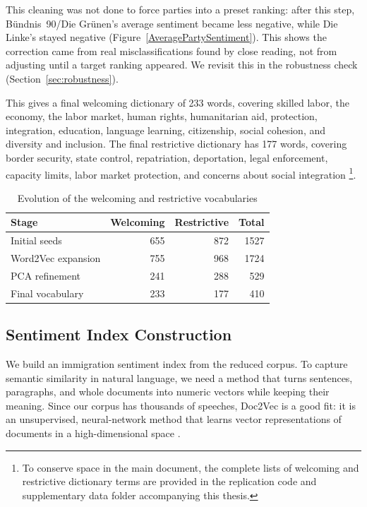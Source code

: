 \documentclass[12pt]{scrartcl}
\numberwithin{equation}{section}				%
\begin{document}
    This cleaning was not done to force parties into a preset ranking: after this step, Bündnis~90/Die Grünen's average sentiment became less negative, while Die Linke's stayed negative (Figure~\ref{AveragePartySentiment}). This shows the correction came from real misclassifications found by close reading, not from adjusting until a target ranking appeared. We revisit this in the robustness check (Section~\ref{sec:robustness}).
    
    This gives a final welcoming dictionary of 233 words, covering skilled labor, the economy, the labor market, human rights, humanitarian aid, protection, integration, education, language learning, citizenship, social cohesion, and diversity and inclusion. The final restrictive dictionary has 177 words, covering border security, state control, repatriation, deportation, legal enforcement, capacity limits, labor market protection, and concerns about social integration \footnote{To conserve space in the main document, the complete lists of welcoming and restrictive dictionary terms are provided in the replication code and supplementary data folder accompanying this thesis.}.
    
    \begin{table}[htbp]
    	\centering
    	\caption{Evolution of the welcoming and restrictive vocabularies}
    	\label{tab:vocabulary_evolution}
    	\begin{tabular}{lrrr}
    		\toprule
    		\textbf{Stage} & \textbf{Welcoming} & \textbf{Restrictive} & \textbf{Total} \\
    		\midrule
    		Initial seeds & 655 & 872 & 1527 \\
    		Word2Vec expansion & 755 & 968 & 1724 \\
    		PCA refinement & 241 & 288 & 529 \\
    		Final vocabulary & 233 & 177 & 410 \\
    		\bottomrule
    	\end{tabular}
    \end{table}
    
    \subsection{Sentiment Index Construction}
    \label{sentiment-index-construction}
    
    We build an immigration sentiment index from the reduced corpus. To capture semantic similarity in natural language, we need a method that turns sentences, paragraphs, and whole documents into numeric vectors while keeping their meaning. Since our corpus has thousands of speeches, Doc2Vec is a good fit: it is an unsupervised, neural-network method that learns vector representations of documents in a high-dimensional space \parencite{le2014distributed}.
    
\end{document}
